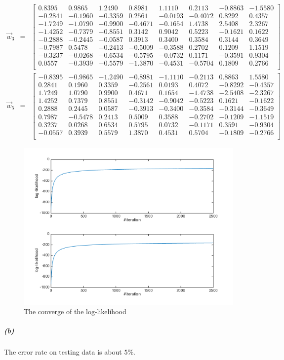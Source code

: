 \documentclass{article}
\begin{document}
\begin{eqnarray*}
	\vec{w}_3 &=& \left[ \begin{array}{cccccccc}
		0.8395 & 0.9865 & 1.2490 & 0.8981 & 1.1110 & 0.2113 & -0.8863 & -1.5580 \\
		-0.2841 & -0.1960 & -0.3359 & 0.2561 & -0.0193 & -0.4072 & 0.8292 & 0.4357 \\
		-1.7249 & -1.0790 & -0.9900 & -0.4671 & -0.1654 & 1.4738 & 2.5408 & 2.3267 \\
		-1.4252 & -0.7379 & -0.8551 & 0.3142 & 0.9042 & 0.5223 & -0.1621 & 0.1622 \\
		-0.2888 & -0.2445 & -0.0587 & 0.3913 & 0.3400 & 0.3584 & 0.3144 & 0.3649 \\
		-0.7987 & 0.5478 & -0.2413 & -0.5009 & -0.3588 & 0.2702 & 0.1209 & 1.1519 \\
		-0.3237 & -0.0268 & -0.6534 & -0.5795 & -0.0732 & 0.1171 & -0.3591 & 0.9304 \\
		0.0557 & -0.3939 & -0.5579 & -1.3870 & -0.4531 & -0.5704 & 0.1809 & 0.2766 \\
	\end{array}\right]\\
	\vec{w}_5 &=& \left[ \begin{array}{cccccccc}
		-0.8395 & -0.9865 & -1.2490 & -0.8981 & -1.1110 & -0.2113 & 0.8863 & 1.5580 \\
		0.2841 & 0.1960 & 0.3359 & -0.2561 & 0.0193 & 0.4072 & -0.8292 & -0.4357 \\
		1.7249 & 1.0790 & 0.9900 & 0.4671 & 0.1654 & -1.4738 & -2.5408 & -2.3267 \\
		1.4252 & 0.7379 & 0.8551 & -0.3142 & -0.9042 & -0.5223 & 0.1621 & -0.1622 \\
		0.2888 & 0.2445 & 0.0587 & -0.3913 & -0.3400 & -0.3584 & -0.3144 & -0.3649 \\
		0.7987 & -0.5478 & 0.2413 & 0.5009 & 0.3588 & -0.2702 & -0.1209 & -1.1519 \\
		0.3237 & 0.0268 & 0.6534 & 0.5795 & 0.0732 & -0.1171 & 0.3591 & -0.9304 \\
		-0.0557 & 0.3939 & 0.5579 & 1.3870 & 0.4531 & 0.5704 & -0.1809 & -0.2766 \\
	\end{array}\right]
\end{eqnarray*}

\begin{figure}
	\centering
	\includegraphics[width=15cm]{converge}
	\caption{The converge of the log-likelihood}
	\label{converge}
\end{figure}

\subparagraph*{(b)}
The error rate on testing data is about $5\%$.
\end{document}
